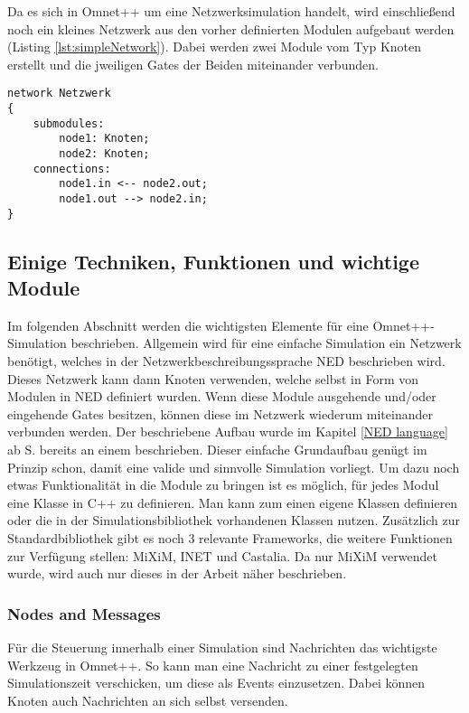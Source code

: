 Da es sich in Omnet++ um eine Netzwerksimulation handelt, wird einschließend noch ein kleines Netzwerk aus den vorher definierten Modulen aufgebaut werden (Listing \ref{lst:simpleNetwork}). Dabei werden zwei Module vom Typ Knoten erstellt und die jweiligen Gates der Beiden miteinander verbunden.
\begin{lstlisting}[language=ned,caption={einfaches Netzwerk},label=lst:simpleNetwork]
network Netzwerk
{
	submodules:
		node1: Knoten;
		node2: Knoten;
	connections:
		node1.in <-- node2.out;
		node1.out --> node2.in;
}
\end{lstlisting}

\subsection{Einige Techniken, Funktionen und wichtige Module}

Im folgenden Abschnitt werden die wichtigsten Elemente für eine Omnet++-Simulation beschrieben. Allgemein wird für eine einfache Simulation ein Netzwerk benötigt, welches in der Netzwerkbeschreibungssprache NED beschrieben wird. Dieses Netzwerk kann dann Knoten verwenden, welche selbst in Form von Modulen in NED definiert wurden. Wenn diese Module ausgehende und/oder eingehende Gates besitzen, können diese im Netzwerk wiederum miteinander verbunden werden. Der beschriebene Aufbau wurde im Kapitel \ref{NED language} ab S.\pageref{StartNedExample} bereits an einem beschrieben. \newline
Dieser einfache Grundaufbau genügt im Prinzip schon, damit eine valide und sinnvolle Simulation vorliegt. Um dazu noch etwas Funktionalität in die Module zu bringen ist es möglich, für jedes Modul eine Klasse in C++ zu definieren. Man kann zum einen eigene Klassen definieren oder die in der Simulationsbibliothek vorhandenen Klassen nutzen.\newline
Zusätzlich zur Standardbibliothek gibt es noch 3 relevante Frameworks, die weitere Funktionen zur Verfügung stellen: MiXiM, INET und Castalia. Da nur MiXiM verwendet wurde, wird auch nur dieses in der Arbeit näher beschrieben.

\subsubsection{Nodes and Messages}\label{para:Nodes and Messages}

Für die Steuerung innerhalb einer Simulation sind Nachrichten das wichtigste Werkzeug in Omnet++. So kann man eine Nachricht zu einer festgelegten Simulationszeit verschicken, um diese als Events einzusetzen. Dabei können Knoten auch Nachrichten an sich selbst versenden.

